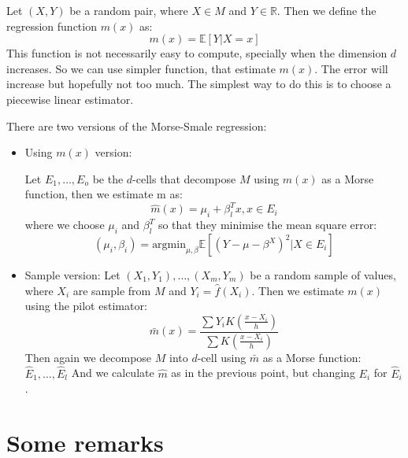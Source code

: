 Let $(X,Y)$ be a random pair, where $X\in M$ and $Y\in\mathbb{R}$.
Then we define the regression function $m(x)$ as:
$$
m(x)=\mathbb{E}[Y\vert X=x]
$$
This function is not necessarily easy to compute, specially when the dimension $d$ increases.
So we can use simpler function, that estimate $m(x)$. The error will increase but hopefully not too much.
The simplest way to do this is to choose a piecewise linear estimator.

There are two versions of the Morse-Smale regression:

\begin{itemize}

    \item Using $m(x)$ version:

        Let $E_1,\ldots,E_o$ be the $d$-cells that decompose $M$ using $m(x)$ 
        as a Morse function,
then we estimate m as:
$$
\hat{m}(x)=\mu_i+\beta_l^T x, x\in E_i
$$
where we choose $\mu_i$ and $\beta_l^T$ so that they minimise the mean square error:
$$
(\mu_i,\beta_i)
=
\text{argmin}_{\mu,\beta}
\mathbb{E}[
    (
    Y-
    \mu-\beta^X
    )^2
    \vert X\in E_i
]
$$

\item Sample version:
    Let $(X_1,Y_1),\ldots,(X_m,Y_m)$ be a random sample of values, where $X_i$ are sample from $M$
        and $Y_i=\hat f(X_i)$. Then we estimate $m(x)$ using the pilot estimator:
        $$
        \bar{m}(x)=
        \frac{
            \sum Y_iK(\frac{x-X_i}{h})
        }
        {
            \sum K(\frac{x-X_i}{h})
        }
        $$
        Then again we decompose $M$ into $d$-cell using  $\bar m$ as a Morse function:$\hat E_1,\ldots,\hat E_l$
        And we calculate $\hat{m}$ as in the previous point, but changing $E_i$ for $\hat E_i$.
\end{itemize}
\section{Some remarks}

